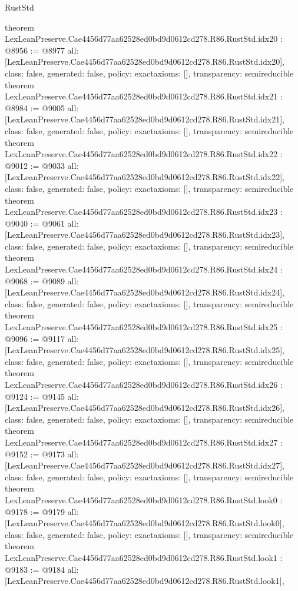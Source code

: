 \begin{lexlean}{RustStd}
\begin{coremodule}
{}
theorem LexLeanPreserve.Cae4456d77aa62528ed0bd9d0612cd278.R86.RustStd.idx20 : @8956 := @8977 {
  all: [LexLeanPreserve.Cae4456d77aa62528ed0bd9d0612cd278.R86.RustStd.idx20],
  class: false,
  generated: false,
  policy: exact{axioms: []},
  transparency: semireducible
}
theorem LexLeanPreserve.Cae4456d77aa62528ed0bd9d0612cd278.R86.RustStd.idx21 : @8984 := @9005 {
  all: [LexLeanPreserve.Cae4456d77aa62528ed0bd9d0612cd278.R86.RustStd.idx21],
  class: false,
  generated: false,
  policy: exact{axioms: []},
  transparency: semireducible
}
theorem LexLeanPreserve.Cae4456d77aa62528ed0bd9d0612cd278.R86.RustStd.idx22 : @9012 := @9033 {
  all: [LexLeanPreserve.Cae4456d77aa62528ed0bd9d0612cd278.R86.RustStd.idx22],
  class: false,
  generated: false,
  policy: exact{axioms: []},
  transparency: semireducible
}
theorem LexLeanPreserve.Cae4456d77aa62528ed0bd9d0612cd278.R86.RustStd.idx23 : @9040 := @9061 {
  all: [LexLeanPreserve.Cae4456d77aa62528ed0bd9d0612cd278.R86.RustStd.idx23],
  class: false,
  generated: false,
  policy: exact{axioms: []},
  transparency: semireducible
}
theorem LexLeanPreserve.Cae4456d77aa62528ed0bd9d0612cd278.R86.RustStd.idx24 : @9068 := @9089 {
  all: [LexLeanPreserve.Cae4456d77aa62528ed0bd9d0612cd278.R86.RustStd.idx24],
  class: false,
  generated: false,
  policy: exact{axioms: []},
  transparency: semireducible
}
theorem LexLeanPreserve.Cae4456d77aa62528ed0bd9d0612cd278.R86.RustStd.idx25 : @9096 := @9117 {
  all: [LexLeanPreserve.Cae4456d77aa62528ed0bd9d0612cd278.R86.RustStd.idx25],
  class: false,
  generated: false,
  policy: exact{axioms: []},
  transparency: semireducible
}
theorem LexLeanPreserve.Cae4456d77aa62528ed0bd9d0612cd278.R86.RustStd.idx26 : @9124 := @9145 {
  all: [LexLeanPreserve.Cae4456d77aa62528ed0bd9d0612cd278.R86.RustStd.idx26],
  class: false,
  generated: false,
  policy: exact{axioms: []},
  transparency: semireducible
}
theorem LexLeanPreserve.Cae4456d77aa62528ed0bd9d0612cd278.R86.RustStd.idx27 : @9152 := @9173 {
  all: [LexLeanPreserve.Cae4456d77aa62528ed0bd9d0612cd278.R86.RustStd.idx27],
  class: false,
  generated: false,
  policy: exact{axioms: []},
  transparency: semireducible
}
theorem LexLeanPreserve.Cae4456d77aa62528ed0bd9d0612cd278.R86.RustStd.look0 : @9178 := @9179 {
  all: [LexLeanPreserve.Cae4456d77aa62528ed0bd9d0612cd278.R86.RustStd.look0],
  class: false,
  generated: false,
  policy: exact{axioms: []},
  transparency: semireducible
}
theorem LexLeanPreserve.Cae4456d77aa62528ed0bd9d0612cd278.R86.RustStd.look1 : @9183 := @9184 {
  all: [LexLeanPreserve.Cae4456d77aa62528ed0bd9d0612cd278.R86.RustStd.look1],
}
\end{coremodule}
\end{lexlean}
